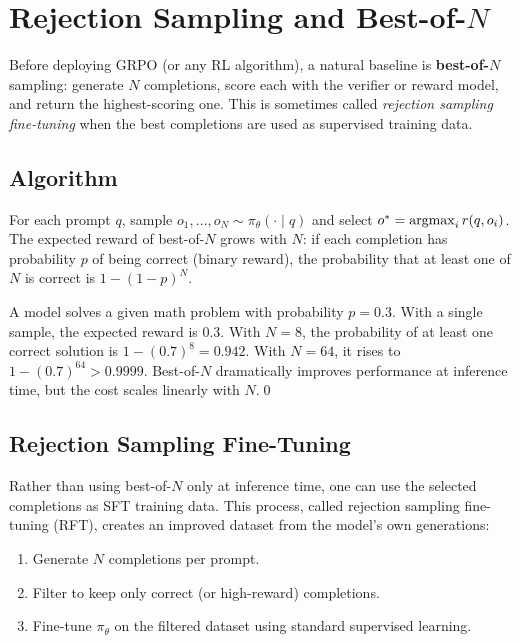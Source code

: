 \section{Rejection Sampling and Best-of-$N$}
\label{sec:rejection-sampling}


Before deploying GRPO (or any RL algorithm), a natural baseline is \textbf{best-of-$N$} sampling: generate $N$ completions, score each with the verifier or reward model, and return the highest-scoring one.  This is sometimes called \emph{rejection sampling fine-tuning} when the best completions are used as supervised training data.

\subsection{Algorithm}

For each prompt $q$, sample $o_1, \ldots, o_N \sim \pi_\theta(\cdot \mid q)$ and select $o^* = \operatorname*{argmax}_{i} r(q, o_i)$.  The expected reward of best-of-$N$ grows with $N$: if each completion has probability $p$ of being correct (binary reward), the probability that at least one of $N$ is correct is $1 - (1-p)^N$.

\begin{example}
\label{ex:best-of-n}
A model solves a given math problem with probability $p = 0.3$.  With a single sample, the expected reward is 0.3.  With $N = 8$, the probability of at least one correct solution is $1 - (0.7)^8 = 0.942$.  With $N = 64$, it rises to $1 - (0.7)^{64} > 0.9999$.  Best-of-$N$ dramatically improves performance at inference time, but the cost scales linearly with $N$.\qed
\end{example}

\subsection{Rejection Sampling Fine-Tuning}

Rather than using best-of-$N$ only at inference time, one can use the selected completions as SFT training data.  This process, called rejection sampling fine-tuning (RFT), creates an improved dataset from the model's own generations:
\begin{enumerate}[leftmargin=*]
  \item Generate $N$ completions per prompt.
  \item Filter to keep only correct (or high-reward) completions.
  \item Fine-tune $\pi_\theta$ on the filtered dataset using standard supervised learning.
\end{enumerate}


